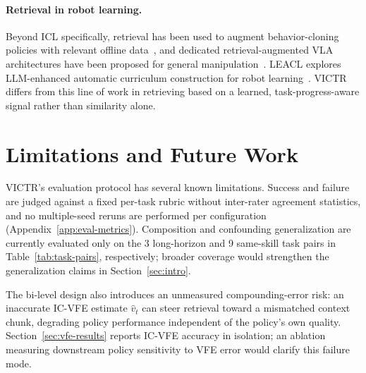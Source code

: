 \documentclass[conference]{IEEEtran}
\newcommand{\method}{VICTR\xspace}
\begin{document}
\paragraph{Retrieval in robot learning.} Beyond ICL specifically, retrieval
has been used to augment behavior-cloning policies with relevant
offline data~\cite{mimicgen}, and dedicated retrieval-augmented VLA
architectures have been proposed for general manipulation~\cite{retrievalvla}.
LEACL explores LLM-enhanced automatic curriculum construction for robot
learning~\cite{leacl}. \method differs from this line of work in retrieving
based on a learned, task-progress-aware signal rather than similarity alone.






\section{Limitations and Future Work}
\label{sec:limitations}

\method's evaluation protocol has several known limitations. Success and
failure are judged against a fixed per-task rubric without inter-rater
agreement statistics, and no multiple-seed reruns are performed per
configuration (Appendix~\ref{app:eval-metrics}). Composition and confounding
generalization are currently evaluated only on the 3 long-horizon and 9
same-skill task pairs in Table~\ref{tab:task-pairs}, respectively; broader
coverage would strengthen the generalization claims in
Section~\ref{sec:intro}.

The bi-level design also introduces an unmeasured compounding-error risk: an
inaccurate IC-VFE estimate $\hat v_t$ can steer retrieval toward a
mismatched context chunk, degrading policy performance independent of the
policy's own quality. Section~\ref{sec:vfe-results} reports IC-VFE accuracy
in isolation; an ablation measuring downstream policy sensitivity to VFE
error would clarify this failure mode.
\end{document}
